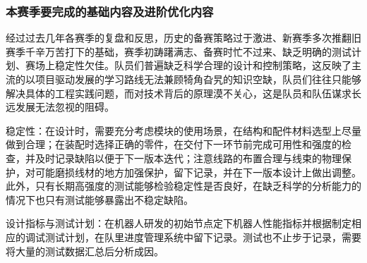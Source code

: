         \subsubsection{本赛季要完成的基础内容及进阶优化内容}

                经过过去几年各赛季的复盘和反思，历史的备赛策略过于激进、新赛季多次推翻旧赛季千辛万苦打下的基础，赛季初踌躇满志、备赛时忙不过来、缺乏明确的测试计划、赛场上稳定性欠佳。队员们普遍缺乏科学合理的设计和控制策略，这反映了主流的以项目驱动发展的学习路线无法兼顾犄角旮旯的知识空缺，队员们往往只能够解决具体的工程实践问题，而对技术背后的原理漠不关心，这是队员和队伍谋求长远发展无法忽视的阻碍。\par
                稳定性：在设计时，需要充分考虑模块的使用场景，在结构和配件材料选型上尽量做到合理；在装配时选择正确的零件，在交付下一环节前完成可用性和强度的检查，并及时记录缺陷以便于下一版本迭代；注意线路的布置合理与线束的物理保护，对可能磨损线材的地方加强保护，留下记录，并在下一版本设计上做出调整。此外，只有长期高强度的测试能够检验稳定性是否良好，在缺乏科学的分析能力的情况下也只有测试能够暴露出不稳定缺陷。\par
                设计指标与测试计划：在机器人研发的初始节点定下机器人性能指标并根据制定相应的调试测试计划，在队里进度管理系统中留下记录。测试也不止步于记录，需要将大量的测试数据汇总后分析成因。\par


            
